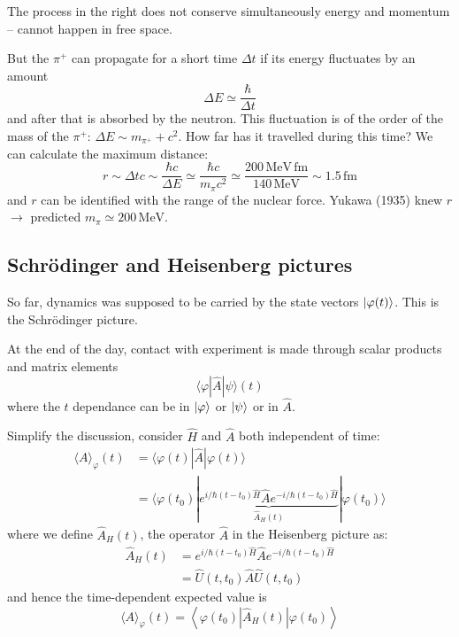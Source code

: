 \documentclass[12pt]{article}
\newcommand{\be}{\begin{equation}}
\newcommand{\ee}{\end{equation}}
\begin{document}
The process in the right
does not conserve 
simultaneously
energy and
momentum
-- cannot happen
in free space.

But the $\pi^+$ can propagate for a short time $\Delta t$
if its energy fluctuates by an amount
\be
\Delta E \simeq \frac{\hbar}{\Delta t}
\ee
and after that is absorbed by the neutron.
This fluctuation is of the order of the mass
of the $\pi^+$: $\Delta E \sim m_{\pi^+}+c^{2}$.
How far has it travelled during this time?
We can calculate the maximum distance:
\be
r \sim \Delta t c \sim \frac{\hbar c}{\Delta E} \simeq \frac{\hbar c}{m_{\pi} c^{2}} \simeq \frac{200\, \text{MeV}\,\text{fm}}{140\,\text{MeV}} \sim 1.5\,\text{fm}
\ee
and $r$ can be identified with the range of the nuclear force.
Yukawa (1935) knew $r$ $\to$ predicted $m_\pi \simeq 200\,\text{MeV}$.


\subsection{Schrödinger and Heisenberg pictures}

So far, dynamics was supposed to be
carried by the state vectors $\ket{\varphi(t)}$.
This is the Schrödinger picture.

At the end of the day, contact with experiment
is made through scalar products and
matrix elements
\[
\langle\varphi|\hat{A}| \psi\rangle(t)
\]
where the $t$ dependance can be 
in $\ket{\varphi}$ or $\ket{\psi}$
or in $\hat{A}$.


Simplify the discussion, consider $\hat{H}$ and $\hat{A}$
both independent of time:
\[
\begin{aligned}
\langle A\rangle_{\varphi}(t) 
&=\langle\varphi(t)|\hat{A}| \varphi(t)\rangle \\ 
&=\langle\varphi(t_{0})
|
\underbrace{
e^{i  / \hbar\left(t-t_{0}\right) \hat{H}} 
\hat{A} 
e^{-i / \hbar\left(t-t_{0}\right) \hat{H}}
}%
_{\hat{A}_H(t)}
| 
\varphi(t_{0})\rangle
\end{aligned}
\]
where we define $\hat{A}_H(t)$, the operator $\hat{A}$ in the Heisenberg picture as:
\be
\begin{aligned} 
\hat{A}_{H}(t) &=e^{i / \hbar\left(t-t_{0}\right) \hat{H}} \hat{A} e^{-i / \hbar\left(t-t_{0}\right) \hat{H}} \\ 
&=\hat{U}\left(t, t_{0}\right) \hat{A} \hat{U}\left(t, t_{0}\right)
\end{aligned}
\ee
and hence the time-dependent expected value is
\be
\langle A\rangle_{\varphi}(t)=\left\langle\varphi\left(t_{0}\right)\left|\hat{A}_{H}(t)\right| \varphi\left(t_{0}\right)\right\rangle
\ee
\end{document}

